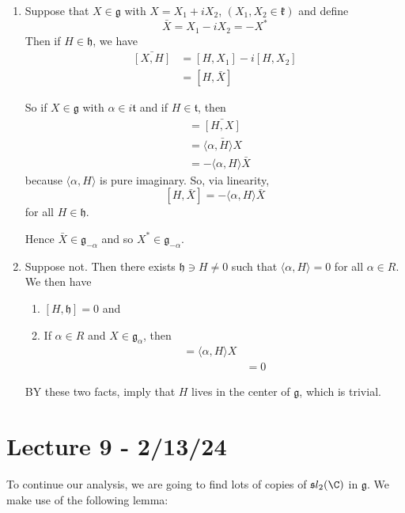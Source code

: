 \documentclass[x11names,reqno,14pt]{extarticle}
\newcommand{\mk}[1]{\mathfrak{#1}}
\newcommand{\g}{\mk{g}}
\newcommand{\h}{\mk{h}}
\begin{document}
\begin{enumerate}

\item Suppose that $X \in \g$ with $X = X_1 + iX_2$, $(X_1, X_2 \in \mk{k})$ and define
\[
\bar{X} = X_1 - iX_2 = -X^*
\]
Then if $H\in\h$, we have
\begin{align*}
\bar{[X,H]} & = [H,X_1] - i[H,X_2] \\
&= [H,\bar{X}]
\end{align*}

So if $X \in \g$ with $\alpha \in i\mk{t}$ and if $H \in \mk{t}$, then 
\begin{align*}
[H,\bar{X}] & = \bar{[H,X]} \\
& = \bar{\langle \alpha, H \rangle X } \\
& = -\langle\alpha, H \rangle \bar{X}
\end{align*}
because $\langle\alpha, H\rangle$ is pure imaginary. So, via linearity, 
\[
[H,\bar{X}] = -\langle\alpha,H\rangle\bar{X}
\]
for all $H \in \h$. 

Hence $\bar{X} \in \g_{-\alpha}$ and so $X^* \in \g_{-\alpha}$.

\item Suppose not. Then there exists $\h\ni H\neq0$ such that $\langle\alpha, H \rangle = 0$ for all $\alpha\in R$. We then have
\begin{enumerate}

\item $[H,\h] = 0$ and 

\item If $\alpha\in R$ and $X \in \g_\alpha$, then 
\begin{align*}
[H,X] = \langle \alpha, H \rangle X \\
& = 0 
\end{align*}

\end{enumerate}

BY these two facts, imply that $H$ lives in the center of $\g$, which is trivial. 

\end{enumerate}

\section*{Lecture 9 - 2/13/24}

To continue our analysis, we are going to find lots of copies of $\mk{s} l_2(\C)$ in $\g$. We make use of the following lemma:
\end{document}
